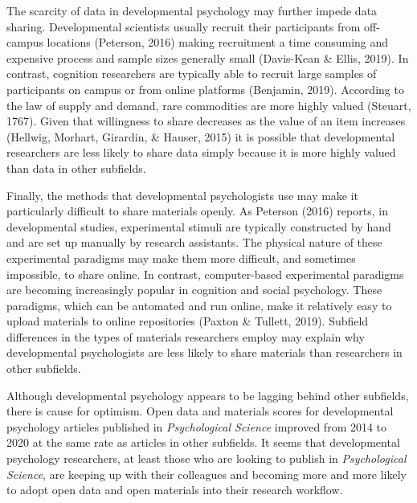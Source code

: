 \documentclass[
  english,
  man,floatsintext]{apa6}
\begin{document}
The scarcity of data in developmental psychology may further impede data sharing. Developmental scientists usually recruit their participants from off-campus locations (Peterson, 2016) making recruitment a time consuming and expensive process and sample sizes generally small (Davis-Kean \& Ellis, 2019). In contrast, cognition researchers are typically able to recruit large samples of participants on campus or from online platforms (Benjamin, 2019). According to the law of supply and demand, rare commodities are more highly valued (Steuart, 1767). Given that willingness to share decreases as the value of an item increases (Hellwig, Morhart, Girardin, \& Hauser, 2015) it is possible that developmental researchers are less likely to share data simply because it is more highly valued than data in other subfields.

Finally, the methods that developmental psychologists use may make it particularly difficult to share materials openly. As Peterson (2016) reports, in developmental studies, experimental stimuli are typically constructed by hand and are set up manually by research assistants. The physical nature of these experimental paradigms may make them more difficult, and sometimes impossible, to share online. In contrast, computer-based experimental paradigms are becoming increasingly popular in cognition and social psychology. These paradigms, which can be automated and run online, make it relatively easy to upload materials to online repositories (Paxton \& Tullett, 2019). Subfield differences in the types of materials researchers employ may explain why developmental psychologists are less likely to share materials than researchers in other subfields.

Although developmental psychology appears to be lagging behind other subfields, there is cause for optimism. Open data and materials scores for developmental psychology articles published in \emph{Psychological Science} improved from 2014 to 2020 at the same rate as articles in other subfields. It seems that developmental psychology researchers, at least those who are looking to publish in \emph{Psychological Science}, are keeping up with their colleagues and becoming more and more likely to adopt open data and open materials into their research workflow.
\end{document}
